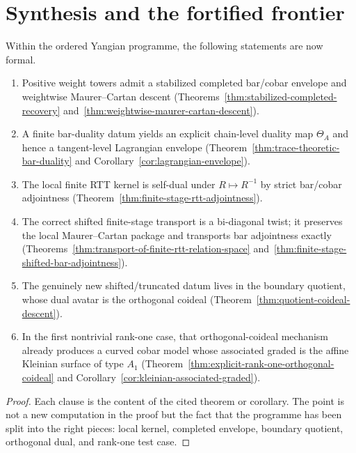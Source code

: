 \section{Synthesis and the fortified frontier}
\label{sec:synthesis-fortified-frontier}

\begin{theorem}
\label{thm:fortified-frontier-package}
Within the ordered Yangian programme, the following statements are now formal.
\begin{enumerate}[label=\textup{(\arabic*)}]
\item Positive weight towers admit a stabilized completed bar/cobar envelope and
  weightwise Maurer--Cartan descent
  \textup{(}Theorems~\ref{thm:stabilized-completed-recovery}
  and~\ref{thm:weightwise-maurer-cartan-descent}\textup{)}.
\item A finite bar-duality datum yields an explicit chain-level duality map
  $\Theta_A$ and hence a tangent-level Lagrangian envelope
  \textup{(}Theorem~\ref{thm:trace-theoretic-bar-duality} and
  Corollary~\ref{cor:lagrangian-envelope}\textup{)}.
\item The local finite RTT kernel is self-dual under
  $R\mapsto R^{-1}$ by strict bar/cobar adjointness
  \textup{(}Theorem~\ref{thm:finite-stage-rtt-adjointness}\textup{)}.
\item The correct shifted finite-stage transport is a bi-diagonal twist; it
  preserves the local Maurer--Cartan package and transports bar adjointness
  exactly \textup{(}Theorems~\ref{thm:transport-of-finite-rtt-relation-space}
  and~\ref{thm:finite-stage-shifted-bar-adjointness}\textup{)}.
\item The genuinely new shifted/truncated datum lives in the boundary quotient,
  whose dual avatar is the orthogonal coideal
  \textup{(}Theorem~\ref{thm:quotient-coideal-descent}\textup{)}.
\item In the first nontrivial rank-one case, that orthogonal-coideal mechanism
  already produces a curved cobar model whose associated graded is the affine
  Kleinian surface of type $A_1$
  \textup{(}Theorem~\ref{thm:explicit-rank-one-orthogonal-coideal} and
  Corollary~\ref{cor:kleinian-associated-graded}\textup{)}.
\end{enumerate}
\end{theorem}

\begin{proof}
Each clause is the content of the cited theorem or corollary.  The point is not
a new computation in the proof but the fact that the programme has been split
into the right pieces: local kernel, completed envelope, boundary quotient,
orthogonal dual, and rank-one test case.
\end{proof}

